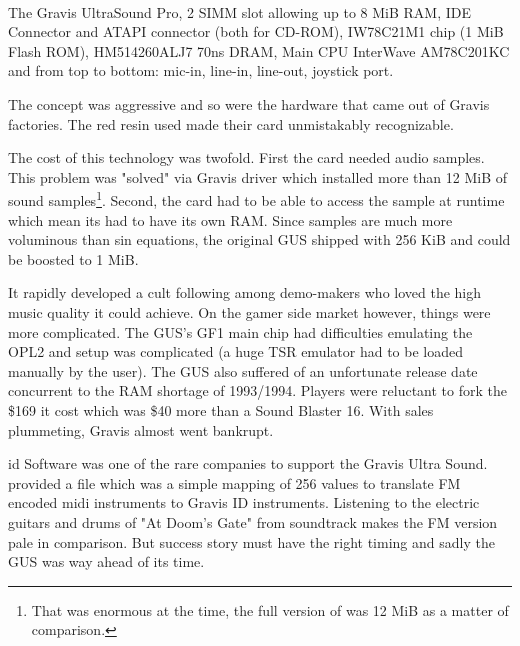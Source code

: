 \\
\par
The Gravis UltraSound Pro,  2 SIMM slot allowing up to 8 MiB RAM,  IDE Connector and  ATAPI connector (both for CD-ROM),  IW78C21M1 chip (1 MiB Flash ROM),  HM514260ALJ7 70ns DRAM,  Main CPU InterWave AM78C201KC and  from top to bottom: mic-in, line-in, line-out, joystick port.\\

The concept was aggressive and so were the hardware that came out of Gravis factories. The red resin used made their card unmistakably recognizable.\\
\par
The cost of this technology was twofold. First the card needed audio samples. This problem was "solved" via Gravis driver which installed more than 12 MiB of sound samples\footnote{That was enormous at the time, the full version of \doom{} was 12 MiB as a matter of comparison.}. Second, the card had to be able to access the sample at runtime which mean its had to have its own RAM. Since samples are much more voluminous than sin equations, the original GUS shipped with 256 KiB and could be boosted to 1 MiB.\\
\par
It rapidly developed a cult following among demo-makers who loved the high music quality it could achieve. On the gamer side market however, things were more complicated. The GUS's GF1 main chip had difficulties emulating the OPL2 and setup was complicated (a huge TSR emulator had to be loaded manually by the user). The GUS also suffered of an unfortunate release date concurrent to the RAM shortage of 1993/1994. Players were reluctant to fork the \$169 it cost which was \$40 more than a Sound Blaster 16. With sales plummeting, Gravis almost went bankrupt.\\
\par
 id Software was one of the rare companies to support the Gravis Ultra Sound. \doom{}provided a  file which was a simple mapping of 256 values to translate FM encoded midi  instruments to Gravis ID instruments. Listening to the electric guitars and drums of "At Doom's Gate" from \doom{} soundtrack makes the FM version pale in comparison. But success story must have the right timing and sadly the GUS was way ahead of its time.

